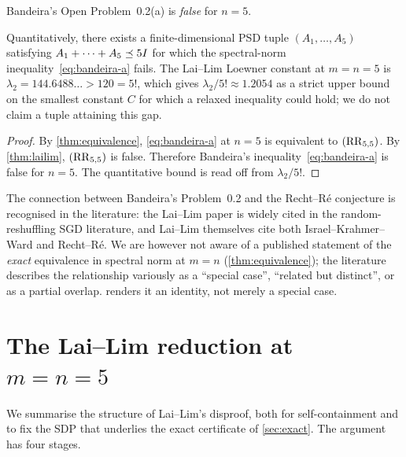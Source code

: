 \begin{corollary}\label{cor:main}
Bandeira's Open Problem~0.2(a) is \emph{false} for $n=5$.

Quantitatively, there exists a finite-dimensional PSD tuple
$(A_1,\dots,A_5)$ satisfying $A_1+\cdots+A_5 \preceq 5I$ for which
the spectral-norm inequality~\eqref{eq:bandeira-a} fails.  The
Lai--Lim Loewner constant at $m=n=5$ is
$\lambda_2 = 144.6488\ldots > 120 = 5!$, which gives
$\lambda_2/5!\approx 1.2054$ as a strict upper bound on the smallest
constant $C$ for which a relaxed inequality could hold; we do not
claim a tuple attaining this gap.
\end{corollary}

\begin{proof}
By \cref{thm:equivalence}, \eqref{eq:bandeira-a} at $n=5$ is
equivalent to $(\mathrm{RR}_{5,5})$.  By \cref{thm:lailim}, $(\mathrm{RR}_{5,5})$ is
false.  Therefore Bandeira's inequality~\eqref{eq:bandeira-a} is false
for $n=5$.  The quantitative bound is read off from $\lambda_2/5!$.
\end{proof}

\begin{remark}\label{rem:literature}
The connection between Bandeira's Problem~0.2 and the Recht--R\'e
conjecture is recognised in the literature: the Lai--Lim paper is
widely cited in the random-reshuffling SGD literature, and Lai--Lim
themselves cite both Israel--Krahmer--Ward and Recht--R\'e.  We are
however not aware of a published statement of the \emph{exact}
equivalence in spectral norm at $m=n$ (\cref{thm:equivalence});
the literature describes the relationship variously as a
``special case'', ``related but distinct'', or as a partial overlap.
 renders it an identity, not merely a special case.
\end{remark}

\section{The Lai--Lim reduction at $m=n=5$}
\label{sec:disproof}

We summarise the structure of Lai--Lim's disproof, both for
self-containment and to fix the SDP that underlies the exact
certificate of \cref{sec:exact}.  The argument has four stages.

